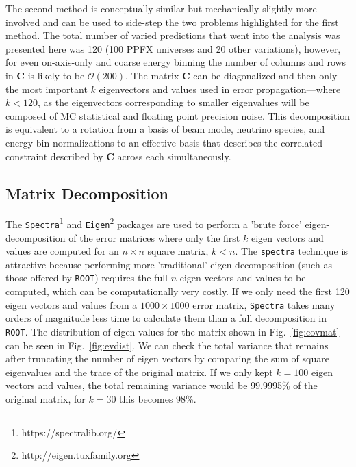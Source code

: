 \documentclass{article}
\begin{document}
The second method is conceptually similar but mechanically slightly more involved and can be used to side-step the two problems highlighted for the first method. The total number of varied predictions that went into the analysis was presented here was 120 (100 PPFX universes and 20 other variations), however, for even on-axis-only and coarse energy binning the number of columns and rows in $\mathbf{C}$ is likely to be $\mathcal{O}\left(200\right)$. The matrix $\mathbf{C}$ can be diagonalized and then only the most important $k$ eigenvectors and values used in error propagation---where $k<120$, as the eigenvectors corresponding to smaller eigenvalues will be composed of MC statistical and floating point precision noise. This decomposition is equivalent to a rotation from a basis of beam mode, neutrino species, and energy bin normalizations to an effective basis that describes the correlated constraint described by $\mathbf{C}$ across each simultaneously.

\subsection{Matrix Decomposition}

The \texttt{Spectra}\footnote{https://spectralib.org/} and \texttt{Eigen}\footnote{http://eigen.tuxfamily.org} packages are used to perform a 'brute force' eigen-decomposition of the error matrices where only the first $k$ eigen vectors and values are computed for an $n\times{}n$ square matrix, $k<n$. The \texttt{spectra} technique is attractive because performing more 'traditional' eigen-decomposition (such as those offered by \texttt{ROOT}) requires the full $n$ eigen vectors and values to be computed, which can be computationally very costly. If we only need the first 120 eigen vectors and values from a $1000\times{}1000$ error matrix, \texttt{Spectra} takes many orders of magnitude less time to calculate them than a full decomposition in \texttt{ROOT}. The distribution of eigen values for the matrix shown in Fig.~\ref{fig:covmat} can be seen in Fig.~\ref{fig:evdist}. We can check the total variance that remains after truncating the number of eigen vectors by comparing the sum of square eigenvalues and the trace of the original matrix. If we only kept $k=100$ eigen vectors and values, the total remaining variance would be 99.9995\% of the original matrix, for $k=30$ this becomes 98\%.
\end{document}

